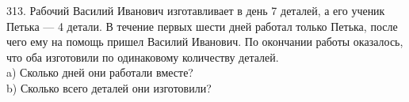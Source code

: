 313. Рабочий Василий Иванович изготавливает в день 7 деталей, а его ученик Петька --- 4 детали. В течение первых шести дней работал только Петька, после чего ему на помощь пришел Василий Иванович. По окончании работы оказалось, что оба изготовили по одинаковому количеству деталей.\\
a) Сколько дней они работали вместе?\\
b) Сколько всего деталей они изготовили?\\
